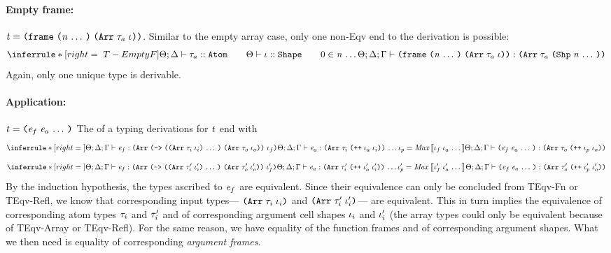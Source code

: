 \begin{sproof}
  \paragraph{Empty frame:}
  $\term = \emptyfrm{\typearray{\type_a}{\idx}}{\sequence{\nat}}$.
  Similar to the empty array case,
  only one non-{\sc Eqv} end to the derivation is possible:
  \[\infr[T-EmptyF]
  {\kindof{\sEnv}{\kEnv}{\type_a}{\kindatom}
    \qquad \sortof{\sEnv}{\idx}{\sortshp}
    \qquad 0 \in \sequence{\nat}}
  {\typeof
    {\sEnv}{\kEnv}{\tEnv}
    {\emptyfrm{\typearray{\type_a}{\idx}}{\sequence{\nat}}}
    {\typearray{\type_a}{\idxshape{\sequence{\nat}}}}}\]
  Again, only one unique type is derivable.
  \paragraph{Application:}
  $\term = \app{\expr_f}{\sequence{\expr_a}}$
  The of a typing derivations for $\mathit{t}$ end with
  \[\infr
  {\typeof
    {\sEnv}{\kEnv}{\tEnv}
    {\expr_f}
    {\typearray
      {\typefun
        {\sequence{\typearray{\type_i}{\idx_i}}}
        {\typearray{\type_o}{\idx_o}}}
      {\idx_f}}
    \\\\
    \sequence{\typeof
      {\sEnv}{\kEnv}{\tEnv}
      {\expr_a}
      {\typearray{\type_i}{\idxappend{\idx_a \; \idx_i}}}}
    \\\\
    \idx_p = \mathit{Max}\llb \idx_f \; \sequence{\idx_a} \rrb}
  {\typeof
    {\sEnv}{\kEnv}{\tEnv}
    {\app{\expr_f}{\sequence{\expr_a}}}
    {\typearray{\type_o}{\idxappend{\idx_p \; \idx_o}}}}\]
  \ctrand
  \[\infr
  {\typeof
    {\sEnv}{\kEnv}{\tEnv}
    {\expr_f}
    {\typearray
      {\typefun
        {\sequence{\typearray{\type_i'}{\idx_i'}}}
        {\typearray{\type_o'}{\idx_o'}}}
      {\idx_f'}}
    \\\\
    \sequence{\typeof
      {\sEnv}{\kEnv}{\tEnv}
      {\expr_a}
      {\typearray{\type_i'}{\idxappend{\idx_a' \; \idx_i'}}}}
    \\\\
    \idx_p' = \mathit{Max}\llb \idx_f' \; \sequence{\idx_a'} \rrb}
  {\typeof
    {\sEnv}{\kEnv}{\tEnv}
    {\app{\expr_f}{\sequence{\expr_a}}}
    {\typearray{\type_o'}{\idxappend{\idx_p' \; \idx_o'}}}}\]
  By the induction hypothesis, the types ascribed to $\mathit{e}_f$ are equivalent.
  Since their equivalence can only be concluded from {\sc TEqv-Fn} or {\sc TEqv-Refl},
  we know that corresponding input types---%
  $\typearray{\type_i}{\idx_i}$ and $\typearray{\type_i'}{\idx_i'}$---%
  are equivalent.
  This in turn implies the equivalence of corresponding atom types $\mathit{\tau}_i$ and $\mathit{\tau}_i'$
  and of corresponding argument cell shapes $\mathit{\iota}_i$ and $\mathit{\iota}_i'$
  (the array types could only be equivalent because of {\sc TEqv-Array} or {\sc TEqv-Refl}).
  For the same reason, we have
  equality of the function frames and of corresponding argument shapes.
  What we then need is equality of corresponding \emph{argument frames}.


\end{sproof}
